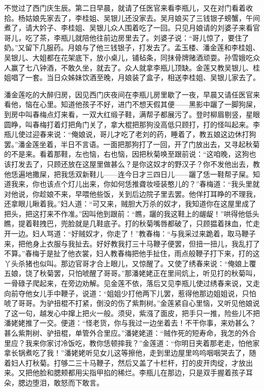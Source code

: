 不觉过了西门庆生辰。第二日早晨，就请了任医官来看李瓶儿，又在对门看着收拾。杨姑娘先家去了，李桂姐、吴银儿还没家去。吴月娘买了三钱银子螃蟹，午间煮了，请大妗子、李桂姐、吴银儿众人围着吃了一回。只见月娘请的刘婆子来看官哥儿，吃了茶，李瓶儿就陪他往前边房里去了。刘婆子说：“哥儿惊了，要住了奶。”又留下几服药。月娘与了他三钱银子，打发去了。孟玉楼、潘金莲和李桂姐、吴银儿、大姐都在花架底下，放小桌儿，铺毡条，同抹骨牌赌酒顽耍。孙雪娥吃众人赢了七八钟酒，不敢久坐，就去了。众人就拿李瓶儿顶缺。金莲又教吴银儿、桂姐唱了一套。当日众姊妹饮酒至晚，月娘装了盒子，相送李桂姐、吴银儿家去了。

潘金莲吃的大醉归房，因见西门庆夜间在李瓶儿房里歇了一夜，早晨又请任医官来看他，恼在心里。知道他孩子不好，进门不想天假其便——黑影中躧了一脚狗屎，到房中叫春梅点灯来看，一双大红缎子鞋，满帮子都展污了。登时柳眉剔竖，星眼圆睁，叫春梅打着灯把角门关了，拿大棍把那狗没高低只顾打，打的怪叫起来。李瓶儿使过迎春来说：“俺娘说，哥儿才吃了老刘的药，睡着了，教五娘这边休打狗罢。”潘金莲坐着，半日不言语。一面把那狗打了一回，开了门放出去，又寻起秋菊的不是来。看着那鞋，左也恼，右也恼，因把秋菊唤至跟前说：“这咱晚，这狗也该打发去了，只顾还放在这屋里做甚么？是你这奴才的野汉子？你不发他出去，教他恁遍地撒屎，把我恁双新鞋儿——连今日才三四日儿——躧了恁一鞋帮子屎。知道我来，你也该点个灯儿出来，你如何恁推聋妆哑装憨儿的？”春梅道：“我头里就对他说，你趁娘不来，早喂他些饭，关到后边院子里去罢。他佯打耳睁的不理我，还拿眼儿瞅着我。”妇人道：“可又来，贼胆大万杀的奴才，我知道你在这屋里成了把头，把这打来不作准。”因叫他到跟前：“瞧，躧的我这鞋上的龌龊！”哄得他低头瞧，提着鞋拽巴，兜脸就是几鞋底子。打的秋菊嘴唇都破了，只顾揾着抹血，忙走开一边。妇人骂道：“好贼奴才，你走了！”教春梅：“与我采过来跪着，取马鞭子来，把他身上衣服与我扯去。好好教我打三十马鞭子便罢，但扭一扭儿，我乱打了不算。”春梅于是扯了他衣裳，妇人教春梅把他手扯住，雨点般鞭子打下来，打的这丫头杀猪也似叫。那边官哥才合上眼儿，又惊醒了。又使了绣春来说：“俺娘上覆五娘，饶了秋菊罢，只怕唬醒了哥哥。”那潘姥姥正\textShouWai 在里间炕上，听见打的秋菊叫，一骨碌子爬起来，在旁边劝解。见金莲不依，落后又见李瓶儿使过绣春来说，又走向前夺他女儿手中鞭子，说道：“姐姐少打他两下儿罢，惹得他那边姐姐说，只怕唬了哥哥。为驴扭棍不打紧，倒没的伤了紫荆树。”金莲紧自心里恼，又听见他娘说了这一句，越发心中撺上把火一般。须臾，紫漒了面皮，把手只一推，险些儿不把潘姥姥推了一交。便道：“怪老货，你与我过一边坐着去！不干你事，来劝甚么？甚么紫荆树、驴扭棍，单管外合里应。”潘姥姥道：“贼作死的短寿命，我怎的外合里应？我来你家讨冷饭吃，教你恁顿摔我？”金莲道：“你明日夹着那老\textMaoBi 走，怕他家拿长锅煮吃了我！”潘姥姥听见女儿这等擦他，走到里边屋里呜呜咽咽哭去了，随着妇人打秋菊。打够二三十马鞭子，然后又盖了十栏杆，打的皮开肉绽，才放出来。又把他脸和腮颊都用尖指甲掐的稀烂。李瓶儿在那边，只是双手握着孩子耳朵，腮边堕泪，敢怒而下敢言。

